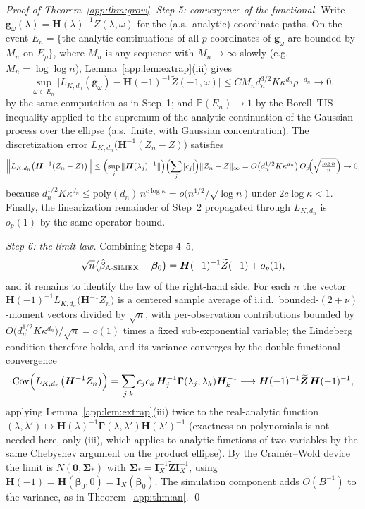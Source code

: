 \documentclass[11pt]{article}
\theoremstyle{plain}
\theoremstyle{definition}
\newcommand{\Prob}{\mathbb{P}}
\newcommand{\Cov}{\mathrm{Cov}}
\newcommand{\bet}{\bm{\beta}}
\newcommand{\bSig}{\bm{\Sigma}}
\newcommand{\asimex}{\textup{A-SIMEX}}
\begin{document}
\begin{proof}[Proof of Theorem~\ref{app:thm:grow}]
\emph{Step 5: convergence of the functional.} Write
$\bm g_\omega(\lambda)=\bm H(\lambda)^{-1}Z(\lambda,\omega)$ for the
(a.s.\ analytic) coordinate paths. On the event
$E_n=\{$the analytic continuations of all $p$ coordinates of
$\bm g_\omega$ are bounded by $M_n$ on $E_\rho\}$, where
$M_n$ is any sequence with $M_n\to\infty$ slowly
(e.g.\ $M_n=\log\log n$), Lemma~\ref{app:lem:extrap}(iii) gives
\[
  \sup_{\omega\in E_n}\bigl|L_{K,d_n}(\bm g_\omega)
  -\bm H(-1)^{-1}\widetilde Z(-1,\omega)\bigr|
  \le C M_n d_n^{3/2}K\kappa^{d_n}\rho^{-d_n}\longrightarrow 0,
\]
by the same computation as in Step~1; and
$\Prob(E_n)\to1$ by the Borell--TIS inequality applied to the
supremum of the analytic continuation of the Gaussian process over the
ellipse (a.s.\ finite, with Gaussian concentration).
The discretization error
$L_{K,d_n}\bigl(\bm H^{-1}(Z_n-Z)\bigr)$ satisfies
\[
  \Bigl\|L_{K,d_n}\bigl(\bm H^{-1}(Z_n-Z)\bigr)\Bigr\|
  \le\Bigl(\sup_j\|\bm H(\lambda_j)^{-1}\|\Bigr)
     \Bigl(\sum_j|c_j|\Bigr)\|Z_n-Z\|_\infty
  =O\bigl(d_n^{1/2}K\kappa^{d_n}\bigr)\,O_p\!\Bigl(\sqrt{\tfrac{\log n}{n}}\Bigr)
  \to0,
\]
because $d_n^{1/2}K\kappa^{d_n}\le\mathrm{poly}(d_n)\,
n^{c\log\kappa}=o\bigl(n^{1/2}/\sqrt{\log n}\bigr)$ under
$2c\log\kappa<1$. Finally, the linearization remainder of Step~2
propagated through $L_{K,d_n}$ is $o_p(1)$ by the same operator bound.

\emph{Step 6: the limit law.} Combining Steps 4--5,
\[
  \sqrt n\bigl(\hat\beta_{\asimex}-\bet_0\bigr)
  =\bm H(-1)^{-1}\widetilde Z(-1)+o_p(1),
\]
and it remains to identify the law of the right-hand side. For each $n$
the vector $\bm H(-1)^{-1}L_{K,d_n}\bigl(\bm H^{-1}Z_n\bigr)$ is a
centered sample average of i.i.d.\ bounded-$(2+\nu)$-moment vectors
divided by $\sqrt n$, with per-observation contributions bounded by
$O\bigl(d_n^{1/2}K\kappa^{d_n}\bigr)/\sqrt n=o(1)$ times a fixed
sub-exponential variable; the Lindeberg condition therefore holds, and
its variance converges by the double functional convergence
\[
  \Cov\Bigl(L_{K,d_n}\bigl(\bm H^{-1}Z_n\bigr)\Bigr)
  =\sum_{j,k}c_jc_k\,\bm H_j^{-1}\bm\Gamma(\lambda_j,\lambda_k)\bm H_k^{-1}
  \longrightarrow
  \bm H(-1)^{-1}\widetilde{\bm Z}\,\bm H(-1)^{-1},
\]
applying Lemma~\ref{app:lem:extrap}(iii) twice to the real-analytic
function $(\lambda,\lambda')\mapsto
\bm H(\lambda)^{-1}\bm\Gamma(\lambda,\lambda')\bm H(\lambda')^{-1}$
(exactness on polynomials is not needed here, only (iii), which applies
to analytic functions of two variables by the same Chebyshev argument on
the product ellipse). By the Cram\'er--Wold device the limit is
$N(\bm 0,\bSig_*)$ with $\bSig_*=\bm I_X^{-1}\widetilde{\bm Z}\bm
I_X^{-1}$, using $\bm H(-1)=\bm H(\bet_0,0)=\bm I_X(\bet_0)$. The
simulation component adds $O(B^{-1})$ to the variance, as in
Theorem~\ref{app:thm:an}. \qed
\end{proof}
\end{document}
